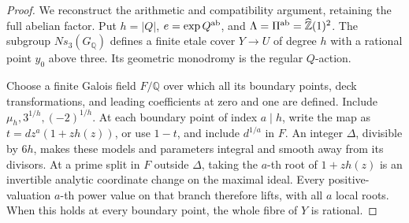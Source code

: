 \begin{proof}
We reconstruct the arithmetic and compatibility argument, retaining the
full abelian factor. Put \(h=|Q|\), \(e=\exp Q^{\rm ab}\), and
\(\Lambda=\Pi^{\rm ab}=\widehat{\mathbb Z}(1)^2\).
The subgroup \(Ns_3(G_{\mathbb Q})\) defines a finite etale cover
\(Y\to U\) of degree \(h\) with a rational point \(y_0\) above three.
Its geometric monodromy is the regular \(Q\)-action.

Choose a finite Galois field \(F/\mathbb Q\) over which all its boundary
points, deck transformations, and leading coefficients at zero and one
are defined. Include \(\mu_h,3^{1/h},(-2)^{1/h}\). At each boundary
point of index \(a\mid h\), write the map as
\(t=d z^a(1+zh(z))\), or use \(1-t\), and include \(d^{1/a}\)
in \(F\). An integer \(\Delta\), divisible by \(6h\), makes these
models and parameters integral and smooth away from its divisors.
At a prime split in \(F\) outside \(\Delta\), taking the \(a\)-th
root of \(1+zh(z)\) is an invertible analytic coordinate change on the
maximal ideal. Every positive-valuation \(a\)-th power value on that
branch therefore lifts, with all \(a\) local roots. When this holds at
every boundary point, the whole fibre of \(Y\) is rational.


\end{proof}
